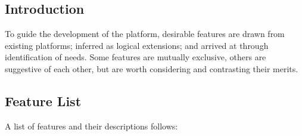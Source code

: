 \subsection{Introduction}\label{subsec:lsf-intro}

To guide the development of the platform, desirable features are drawn from existing platforms; inferred as logical extensions; and arrived at through identification of needs.
Some features are mutually exclusive, others are suggestive of each other, but are worth considering and contrasting their merits.

\subsection{Feature List}\label{subsec:feature-list}

A list of features and their descriptions follows:

